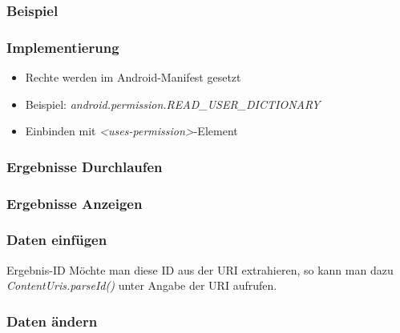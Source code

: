 \begin{frame}
   \frametitle{Beispiel}
	
\end{frame}

\begin{frame}
   \frametitle{Implementierung}
   \begin{itemize}
   	\item Rechte werden im Android-Manifest gesetzt
   	\item Beispiel: \emph{android.permission.READ\_USER\_DICTIONARY}
   	\item Einbinden mit \emph{\textless{}uses-permission\textgreater}-Element
   \end{itemize}

	

	
\end{frame}

\begin{frame}
   \frametitle{Ergebnisse Durchlaufen}
	
\end{frame}

\begin{frame}
   \frametitle{Ergebnisse Anzeigen}
	
\end{frame}

\begin{frame}
   \frametitle{Daten einfügen}
	
		
	\begin{alertblock}{Ergebnis-ID}
		Möchte man diese ID aus der URI extrahieren, so kann man dazu 
		\emph{ContentUris.parseId()} unter Angabe der URI aufrufen.
	\end{alertblock}
\end{frame}

\begin{frame}
   \frametitle{Daten ändern}
	
\end{frame}


